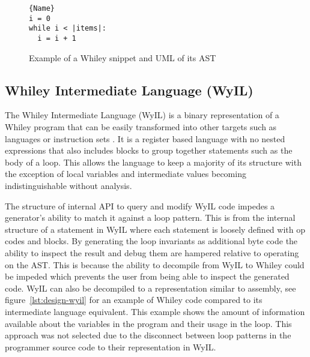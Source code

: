 \begin{figure}
\noindent\begin{minipage}{.45\textwidth}
\begin{lstlisting}[caption={Whiley Code},frame=tlrb,numbers=none]{Name}
i = 0
while i < |items|:
  i = i + 1
\end{lstlisting}
\end{minipage}\hfill
\begin{minipage}{.45\textwidth}
\end{minipage}
\caption{Example of a Whiley snippet and UML of its AST}
\label{lst:design-whiley}
\end{figure}

\subsection{Whiley Intermediate Language (WyIL)}

The Whiley Intermediate Language (WyIL) is a binary representation of a Whiley program
that can be easily transformed into other targets such as languages or
instruction sets \cite{wyil}.
It is a register based language with no nested expressions
that also includes blocks to group together statements such as the body of a loop.
This allows the language to keep a majority of its structure with the
exception of local variables and intermediate values becoming indistinguishable
without analysis.

The structure of internal API to query and modify WyIL code impedes a
generator's ability to match it against a loop pattern.
This is from the internal structure of a statement in WyIL where each
statement is loosely defined with op codes and blocks.
By generating the loop invariants as additional byte code the ability to
inspect the result and debug them are hampered relative to operating on the
AST.  This is because the ability to decompile from WyIL to Whiley could
be impeded which prevents the user from being able to inspect the generated
code.
WyIL can also be decompiled to a representation similar to assembly, see
figure~\ref{lst:design-wyil} for an example of Whiley code compared to its
intermediate language equivalent.
This example shows the amount of information available about the variables
in the program and their usage in the loop.
This approach was not selected due to the disconnect between loop patterns
in the programmer source code to their representation in WyIL.



